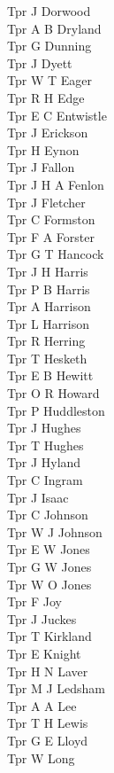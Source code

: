 \begin{multicols}{2}
  Tpr J Dorwood \\
  Tpr A B Dryland \\
  Tpr G Dunning \\
  Tpr J Dyett \\
  Tpr W T Eager \\
  Tpr R H Edge \\
  Tpr E C Entwistle \\
  Tpr J Erickson \\
  Tpr H Eynon \\
  Tpr J Fallon \\
  Tpr J H A Fenlon \\
  Tpr J Fletcher \\
  Tpr C Formston \\
  Tpr F A Forster \\
  Tpr G T Hancock \\
  Tpr J H Harris \\
  Tpr P B Harris \\
  Tpr A Harrison \\
  Tpr L Harrison \\
  Tpr R Herring \\
  Tpr T Hesketh \\
  Tpr E B Hewitt \\
  Tpr O R Howard \\
  Tpr P Huddleston \\
  Tpr J Hughes \\
  Tpr T Hughes \\
  Tpr J Hyland \\
  Tpr C Ingram \\
  Tpr J Isaac \\
  Tpr C Johnson \\
  Tpr W J Johnson \\
  Tpr E W Jones \\
  Tpr G W Jones \\
  Tpr W O Jones \\
  Tpr F Joy \\
  Tpr J Juckes \\
  Tpr T Kirkland \\
  Tpr E Knight \\
  Tpr H N Laver \\
  Tpr M J Ledsham \\
  Tpr A A Lee \\
  Tpr T H Lewis \\
  Tpr G E Lloyd \\
  Tpr W Long \\

\end{multicols}

